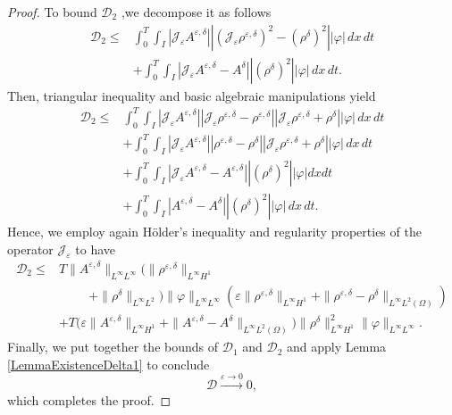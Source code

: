 \documentclass[12pt]{amsart}
\newcommand{\Jrho}{\mathcal{J_\varepsilon}\rho^{\varepsilon,\delta}}
\newcommand{\JA}{\mathcal{J_\varepsilon}A^{\varepsilon,\delta}}
\newcommand{\D}{\,d}
\begin{document}
\begin{proof}
To bound $\mathcal{D}_2$ ,we decompose it as follows 
\begin{equation*}
	\begin{split}
		\mathcal{D}_2\leq& \int_0^T\int_{I} |\JA|| (\Jrho)^2-(\rho^\delta)^2||\varphi| \D x \D t\\
       &+\int_0^T\int_{I} |\JA-A^\delta|| (\rho^\delta)^2||\varphi|\D x \D t.
       \end{split}
\end{equation*}
Then, triangular inequality and basic algebraic manipulations yield
\begin{equation*}
	\begin{split}
		\mathcal{D}_2\leq & \int_0^T\int_{I} |\JA|| \Jrho-\rho^{\varepsilon,\delta}|| \Jrho+\rho^\delta||\varphi|\D x \D t\\
		&+\int_0^T\int_{I} |\JA|| \rho^{\varepsilon,\delta}-\rho^\delta|| \Jrho+\rho^\delta||\varphi|\D x \D t\\
		&+\int_0^T\int_{I} |\JA-A^{\varepsilon,\delta}|| (\rho^\delta)^2||\varphi|dxdt\\
       &+\int_0^T\int_{I} |A^{\varepsilon,\delta}-A^\delta|| (\rho^\delta)^2||\varphi|\D x \D t.
	\end{split}
\end{equation*}
Hence, we employ again Hölder's inequality and  regularity properties of the operator $\mathcal{J}_\varepsilon$ to have
\begin{equation*}
	\begin{split}
		\mathcal{D}_2\leq & T\|A^{\varepsilon,\delta}\|_{L^\infty L^\infty}\Big(\|\rho^{\varepsilon,\delta}\|_{L^\infty H^1} \\
       &\hspace{1cm}+\|\rho^\delta\|_{L^\infty L^2}\Big)\|\varphi\|_{L^\infty L^\infty}(\varepsilon\|\rho^{\varepsilon,\delta}\|_{L^\infty H^1}+\|\rho^{\varepsilon,\delta}-\rho^\delta\|_{L^\infty L^2(\Omega)})\\
		&+T\Big(\varepsilon\|A^{\varepsilon,\delta}\|_{L^\infty H^1}+\|A^{\varepsilon,\delta}-A^\delta\|_{L^\infty L^2(\Omega)}\Big)\|\rho^\delta\|_{L^\infty H^1}^2\|\varphi\|_{L^\infty L^\infty}.
	\end{split}
\end{equation*}
Finally, we put together the bounds of $\mathcal{D}_1$ and  $\mathcal{D}_2$ and apply Lemma \ref{LemmaExistenceDelta1} to conclude
\begin{equation*}
    \mathcal{D}\overset{\varepsilon\to0}{\rightarrow}0,
\end{equation*}
which completes the proof.
\end{proof}
\end{document}
